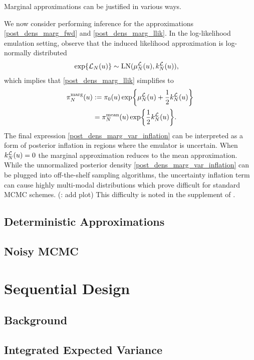 \documentclass[12pt]{article}
\begin{document}
Marginal approximations can be justified in various ways. \todo

We now consider performing inference for the approximations \ref{post_dens_marg_fwd} and \ref{post_dens_marg_llik}. 
In the log-likelihood emulation setting, observe that the induced likelihood approximation is log-normally distributed
\begin{align}
\Exp{\llikEm[\Ndesign](\Par)} &\sim \LN(\emMean[\Ndesign]{\llik}(\Par), \emKer[\Ndesign]{\llik}(\Par)), 
\end{align}
which implies that \ref{post_dens_marg_llik} simplifies to 
\begin{align}
\llikEmMargDens[\Ndesign](\Par) 
&:= \priorDens(\Par) \Exp{\emMean[\Ndesign]{\llik}(\Par) + \frac{1}{2} \emKer[\Ndesign]{\llik}(\Par)} 
\label{post_dens_marg_llik_simplified} \\
&= \llikEmMeanDens[\Ndesign](\Par) \Exp{\frac{1}{2} \emKer[\Ndesign]{\llik}(\Par)}. 
\label{post_dens_marg_var_inflation}
\end{align}
The final expression \ref{post_dens_marg_var_inflation} can be interpreted as a form of posterior inflation 
in regions where the emulator is uncertain. When $\emKer[\Ndesign]{\llik}(\Par) = 0$ the marginal approximation 
reduces to the mean approximation. While the unnormalized posterior density \ref{post_dens_marg_var_inflation}
can be plugged into off-the-shelf sampling algorithms, the uncertainty inflation term can cause highly multi-modal 
distributions which prove difficult for standard MCMC schemes. (\todo: add plot) This difficulty is noted in the 
supplement of \cite{VehtariParallelGP}.


\subsection{Deterministic Approximations}
\subsection{Noisy MCMC}

\section{Sequential Design}
\subsection{Background}
\subsection{Integrated Expected Variance}
\end{document}
